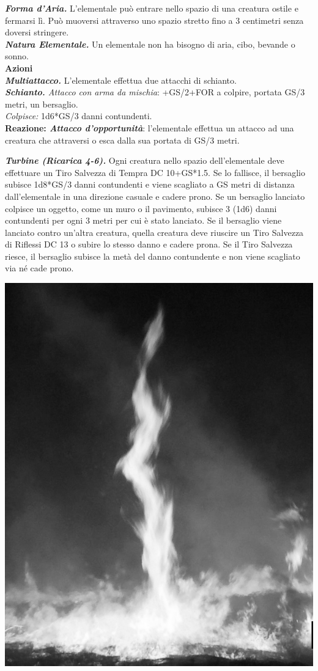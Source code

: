 \begin{multicols}{2}
{\emph{\textbf{Forma d'Aria.}} L'elementale può entrare nello spazio di una creatura ostile e fermarsi lì. Può muoversi attraverso uno spazio stretto fino a 3 centimetri senza doversi stringere.\\
\emph{\textbf{Natura Elementale.}} Un elementale non ha bisogno di aria, cibo, bevande o sonno.\\
\textbf{Azioni}\\
\emph{\textbf{Multiattacco.}} L'elementale effettua due attacchi di schianto.\\
\emph{\textbf{Schianto.} Attacco con arma da mischia}: +GS/2+FOR a colpire, portata GS/3 metri, un bersaglio.\\
\emph{Colpisce:} 1d6*GS/3 danni contundenti.\\

\textbf{Reazione: \emph{Attacco d'opportunità}}: l'elementale effettua un attacco ad una creatura che attraversi o esca dalla sua portata di GS/3 metri.

\emph{\textbf{Turbine (Ricarica 4-6).}} Ogni creatura nello spazio dell'elementale deve effettuare un Tiro Salvezza di Tempra DC 10+GS*1.5. Se lo fallisce, il bersaglio subisce 1d8*GS/3 danni contundenti e viene scagliato a GS metri di distanza dall'elementale in una direzione casuale e cadere prono. Se un bersaglio lanciato colpisce un oggetto, come un muro o il pavimento, subisce 3 (1d6) danni contundenti per ogni 3 metri per cui è stato lanciato. Se il bersaglio viene lanciato contro un'altra creatura, quella creatura deve riuscire un Tiro Salvezza di Riflessi DC 13 o subire lo stesso danno e cadere prona.
Se il Tiro Salvezza riesce, il bersaglio subisce la metà del danno contundente e non viene scagliato via né cade prono.

\begin{center}
	\includegraphics[width=0.7\linewidth]{immagini/wildfire_grayscale.png}
\end{center}

}
\end{multicols}
